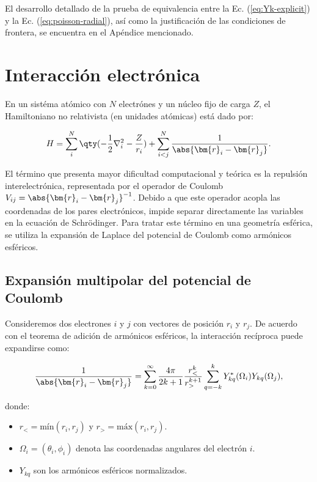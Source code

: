El desarrollo detallado de la prueba de equivalencia entre la Ec. (\ref{eq:Yk-explicit}) y la Ec. (\ref{eq:poisson-radial}), así como la justificación de las condiciones de frontera, se encuentra en el Apéndice mencionado.

\section{Interacción electrónica}

En un sistéma atómico con \( N \) electrónes y un núcleo fijo de carga \( Z \), el Hamiltoniano no relativista (en unidades atómicas) está dado por:

\begin{equation}
  \label{eq:hamiltonian1}
  H = \sum_i^N \qty(- \frac{1}{2}\nabla_i^2 - \frac{Z}{r_i}) + \sum_{i<j}^N \frac{1}{\abs{\bm{r}_i-\bm{r}_j}}.
\end{equation}

El término que presenta mayor dificultad computacional y teórica es la repulsión interelectrónica, representada por el operador de Coulomb \( V_{ij} = \abs{\bm{r}_i-\bm{r}_j}^{-1} \). Debido a que este operador acopla las coordenadas de los pares electrónicos, impide separar directamente las variables en la ecuación de Schrödinger. Para tratar este término en una geometría esférica, se utiliza la expansión de Laplace del potencial de Coulomb como armónicos esféricos.

\subsection{Expansión multipolar del potencial de Coulomb}

Consideremos dos electrones \( i \) y \( j \) con vectores de posición \( r_i \) y \( r_j \). De acuerdo con el teorema de adición de armónicos esféricos, la interacción recíproca puede expandirse como:

\begin{equation}
  \label{eq:laplace1}
  \frac{1}{\abs{\bm{r}_i - \bm{r}_j}} = \sum_{k=0}^{\infty} \frac{4\pi}{2k+1} \frac{r_<^k}{r_>^{k+1}} \sum_{q = -k}^k Y_{kq}^{*}(\Omega_i) Y_{kq}(\Omega_j),
\end{equation}

donde:

\begin{itemize}
\item \( r_< = \text{mín}(r_i,r_j) \) y \( r_> = \text{máx}(r_i,r_j) \).
\item \( \Omega_i = (\theta_i, \phi_i) \) denota las coordenadas angulares del electrón \( i \).
\item \( Y_{kq} \) son los armónicos esféricos normalizados.
\end{itemize}

